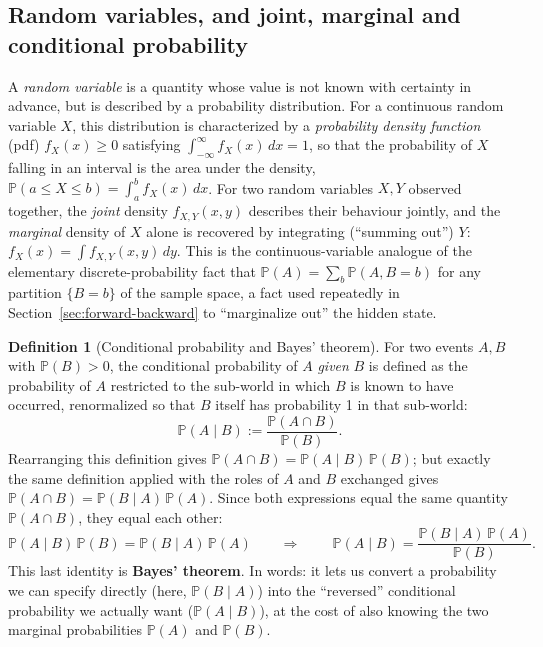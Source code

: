 \documentclass[11pt]{article}
\theoremstyle{definition}
\newtheorem{definition}[theorem]{Definition}
\theoremstyle{remark}
\begin{document}
\subsection{Random variables, and joint, marginal and conditional probability}

A \emph{random variable} is a quantity whose value is not known with certainty in advance, but is described by a probability distribution. For a continuous random variable $X$, this distribution is characterized by a \emph{probability density function} (pdf) $f_X(x)\ge0$ satisfying $\int_{-\infty}^{\infty}f_X(x)\,dx=1$, so that the probability of $X$ falling in an interval is the area under the density, $\mathbb{P}(a\le X\le b)=\int_a^b f_X(x)\,dx$. For two random variables $X,Y$ observed together, the \emph{joint} density $f_{X,Y}(x,y)$ describes their behaviour jointly, and the \emph{marginal} density of $X$ alone is recovered by integrating (``summing out'') $Y$: $f_X(x)=\int f_{X,Y}(x,y)\,dy$. This is the continuous-variable analogue of the elementary discrete-probability fact that $\mathbb{P}(A)=\sum_b\mathbb{P}(A,B=b)$ for any partition $\{B=b\}$ of the sample space, a fact used repeatedly in Section~\ref{sec:forward-backward} to ``marginalize out'' the hidden state.

\begin{definition}[Conditional probability and Bayes' theorem]
For two events $A,B$ with $\mathbb{P}(B)>0$, the conditional probability of $A$ \emph{given} $B$ is defined as the probability of $A$ restricted to the sub-world in which $B$ is known to have occurred, renormalized so that $B$ itself has probability 1 in that sub-world:
\[
\mathbb{P}(A\mid B) := \frac{\mathbb{P}(A\cap B)}{\mathbb{P}(B)}.
\]
Rearranging this definition gives $\mathbb{P}(A\cap B)=\mathbb{P}(A\mid B)\,\mathbb{P}(B)$; but exactly the same definition applied with the roles of $A$ and $B$ exchanged gives $\mathbb{P}(A\cap B)=\mathbb{P}(B\mid A)\,\mathbb{P}(A)$. Since both expressions equal the same quantity $\mathbb{P}(A\cap B)$, they equal each other:
\[
\mathbb{P}(A\mid B)\,\mathbb{P}(B) = \mathbb{P}(B\mid A)\,\mathbb{P}(A) \qquad\Longrightarrow\qquad
\boxed{\ \mathbb{P}(A\mid B) = \frac{\mathbb{P}(B\mid A)\,\mathbb{P}(A)}{\mathbb{P}(B)}. \ }
\]
This last identity is \textbf{Bayes' theorem}. In words: it lets us convert a probability we can specify directly (here, $\mathbb{P}(B\mid A)$) into the ``reversed'' conditional probability we actually want ($\mathbb{P}(A\mid B)$), at the cost of also knowing the two marginal probabilities $\mathbb{P}(A)$ and $\mathbb{P}(B)$.
\end{definition}
\end{document}
